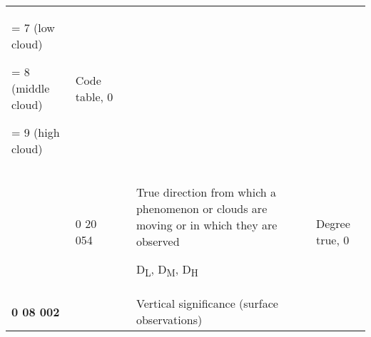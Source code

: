 \begin{longtable}[]{@{}lllll@{}}
\begin{minipage}[t]{0.17\columnwidth}
= 7 (low cloud)

= 8 (middle cloud)

= 9 (high cloud)\strut
\end{minipage} & \begin{minipage}[t]{0.17\columnwidth}\raggedright
Code table, 0\strut
\end{minipage}\tabularnewline
\begin{minipage}[t]{0.17\columnwidth}\raggedright
\strut
\end{minipage} & \begin{minipage}[t]{0.17\columnwidth}\raggedright
0 20 054\strut
\end{minipage} & \begin{minipage}[t]{0.17\columnwidth}\raggedright
\strut
\end{minipage} & \begin{minipage}[t]{0.17\columnwidth}\raggedright
True direction from which a phenomenon or clouds are moving or in which they are observed

D\textsubscript{L}, D\textsubscript{M}, D\textsubscript{H}\strut
\end{minipage} & \begin{minipage}[t]{0.17\columnwidth}\raggedright
Degree true, 0\strut
\end{minipage}\tabularnewline
\begin{minipage}[t]{0.17\columnwidth}\raggedright
\textbf{0 08 002}\strut
\end{minipage} & \begin{minipage}[t]{0.17\columnwidth}\raggedright
\strut
\end{minipage} & \begin{minipage}[t]{0.17\columnwidth}\raggedright
\strut
\end{minipage} & \begin{minipage}[t]{0.17\columnwidth}\raggedright
Vertical significance (surface observations)


\end{minipage}
\end{longtable}
